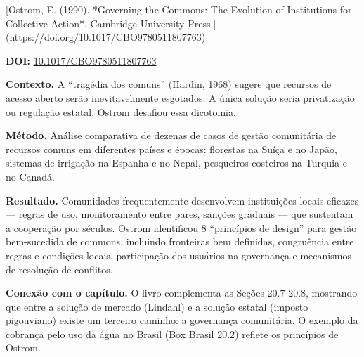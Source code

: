 \documentclass[11pt,twoside,openright]{book}
\begin{document}
\begin{pesquisabox}{[Ostrom, E. (1990). *Governing the Commons: The Evolution of Institutions for Collective Action*. Cambridge University Press.](https://doi.org/10.1017/CBO9780511807763)}

\textbf{DOI:}
\href{https://doi.org/10.1017/CBO9780511807763}{10.1017/CBO9780511807763}

\textbf{Contexto.} A ``tragédia dos comuns'' (Hardin, 1968) sugere que
recursos de acesso aberto serão inevitavelmente esgotados. A única
solução seria privatização ou regulação estatal. Ostrom desafiou essa
dicotomia.

\textbf{Método.} Análise comparativa de dezenas de casos de gestão
comunitária de recursos comuns em diferentes países e épocas: florestas
na Suíça e no Japão, sistemas de irrigação na Espanha e no Nepal,
pesqueiros costeiros na Turquia e no Canadá.

\textbf{Resultado.} Comunidades frequentemente desenvolvem instituições
locais eficazes --- regras de uso, monitoramento entre pares, sanções
graduais --- que sustentam a cooperação por séculos. Ostrom identificou
8 ``princípios de design'' para gestão bem-sucedida de commons,
incluindo fronteiras bem definidas, congruência entre regras e condições
locais, participação dos usuários na governança e mecanismos de
resolução de conflitos.

\textbf{Conexão com o capítulo.} O livro complementa as Seções
20.7-20.8, mostrando que entre a solução de mercado (Lindahl) e a
solução estatal (imposto pigouviano) existe um terceiro caminho: a
governança comunitária. O exemplo da cobrança pelo uso da água no Brasil
(Box Brasil 20.2) reflete os princípios de Ostrom.

\end{pesquisabox}
\end{document}
